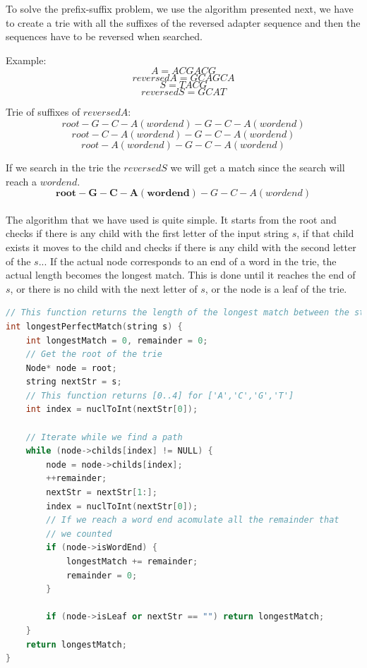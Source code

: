\documentclass[a4paper,10pt]{article}
\begin{document}
To solve the prefix-suffix problem, we use the algorithm presented next, we have to create a trie with all the suffixes of the reversed adapter sequence and then the sequences have to be reversed when searched.

Example: \label{s-example-trie}
$$ A = ACGACG $$
$$ reversedA = GCAGCA $$
$$ S = TACG $$
$$ reversedS = GCAT $$

Trie of suffixes of $reversedA$:
$$root-G-C-A(word end)-G-C-A(wordend)$$
$$root-C-A(wordend)-G-C-A(wordend)$$
$$root-A(wordend)-G-C-A(wordend)$$

If we search in the trie the $reversedS$ we will get a match since the search will reach a $word end$.
$$\mathbf{root-G-C-A(word end)}-G-C-A(wordend)$$

\paragraph{} The algorithm that we have used is quite simple.
It starts from the root and checks if there is any child with the first letter of the input string $s$, if that child exists it moves to the child and checks if there is any child with the second letter of the $s$...
If the actual node corresponds to an end of a word in the trie, the actual length becomes the longest match.
This is done until it reaches the end of $s$, or there is no child with the next letter of $s$, or the node is a leaf of the trie.

\begin{lstlisting}[language=c++, caption=Iterative algorithm for perfect suffix-prefix match]
// This function returns the length of the longest match between the string s and the text stored in the trie 
int longestPerfectMatch(string s) {
    int longestMatch = 0, remainder = 0;
    // Get the root of the trie
    Node* node = root;
    string nextStr = s;
    // This function returns [0..4] for ['A','C','G','T']
    int index = nuclToInt(nextStr[0]);

    // Iterate while we find a path
    while (node->childs[index] != NULL) {
        node = node->childs[index];
        ++remainder;
        nextStr = nextStr[1:];
        index = nuclToInt(nextStr[0]);
        // If we reach a word end acomulate all the remainder that 
        // we counted
        if (node->isWordEnd) {
            longestMatch += remainder;
            remainder = 0;
        }

        if (node->isLeaf or nextStr == "") return longestMatch;
    }
    return longestMatch;
}
\end{lstlisting}
\end{document}
